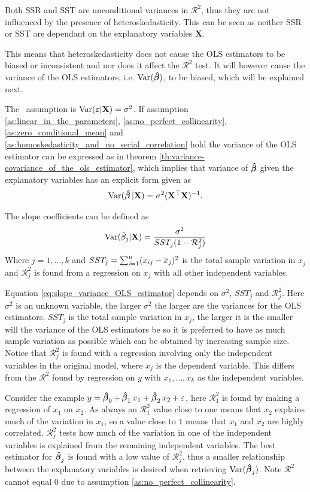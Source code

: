 Both SSR and SST are unconditional variances in $\mathcal{R}^2$, thus they are not influenced by the presence of heteroskedasticity. This can be seen as neither SSR or SST are dependant on the explanatory variables $\textbf{X}$. 

This means that heteroskedasticity does not cause the OLS estimators to be biased or inconsistent and nor does it affect the $\mathcal{R}^2$ test. 
It will however cause the variance of the OLS estimators, i.e. $\operatorname{\text{Var}}(\operatorname{\boldsymbol{\hat{\beta}}})$, to be biased, which will be explained next.  

The \homo \ assumption is $\operatorname{\text{Var}}(\boldsymbol{\varepsilon} | \mathbf{X}) = \sigma^2$. If assumption \ref{as:linear_in_the_parameters}, \ref{as:no_perfect_collinearity}, \ref{as:zero_conditional_mean} and \ref{as:homoskedasticity_and_no_serial_correlation} hold the variance of the OLS estimator can be expressed as in theorem \ref{th:variance-covariance_of_the_ols_estimator}, which implies that variance of $\operatorname{\boldsymbol{\hat{\beta}}}$ given the explanatory variables has an explicit form given as
\begin{align*}
    \operatorname{\text{Var}}(\operatorname{\boldsymbol{\hat{\beta}}} | \mathbf{X}) = \sigma^2(\mathbf{X}^\top\mathbf{X})^{-1}.
\end{align*}


The slope coefficients can be defined as 
\begin{align}\label{eq:slope_variance_OLS_estimator}
    \operatorname{\text{Var}}(\hat{\beta}_j|\mathbf{X}) = \dfrac{\sigma^2}{SST_j(1- \mathcal{R}_j^2)}
\end{align}
Where $j = 1, \ldots, k$ and $SST_j = \operatorname{\sum_{\textit{i}=1}^n} (x_{ij} - \overline{x}_j)^2$ is the total sample variation in $x_j$ and $\mathcal{R}^2_j$ is found from a regression on $x_j$ with all other independent variables. 

Equation \eqref{eq:slope_variance_OLS_estimator} depends on $\sigma^2$, $SST_j$ and $\mathcal{R}^2_j$.
Here $\sigma^2$ is an unknown variable, the larger $\sigma^2$ the larger are the variances for the OLS estimators. $SST_j$ is the total sample variation in $x_j$, the larger it is the smaller will the variance of the OLS estimators be so it is preferred to have as much sample variation as possible which can be obtained by increasing sample size. 
Notice that $\mathcal{R}^2_j$ is found with a regression involving only the independent variables in the original model, where $x_j$ is the dependent variable. 
This differs from the $\mathcal{R}^2$ found by regression on $y$ with $x_1, \ldots, x_k$ as the independent variables. 

Consider the example $y = \operatorname{\boldsymbol{\hat{\beta}}}_0 + \operatorname{\boldsymbol{\hat{\beta}}}_1 x_1 + \operatorname{\boldsymbol{\hat{\beta}}}_2 x_2 + \varepsilon$, here $\mathcal{R}^2_1$ is found by making a regression of $x_1$ on $x_2$. 
As always an $\mathcal{R}^2_1$ value close to one means that $x_2$ explains much of the variation in $x_1$, so a value close to $1$ means that $x_1$ and $x_2$ are highly correlated.
$\mathcal{R}^2_j$ tests how much of the variation in one of the independent variables is explained from the remaining independent variables.
The best estimator for $\operatorname{\boldsymbol{\hat{\beta}}}_j$ is found with a low value of $\mathcal{R}^2_j$, thus a smaller relationship between the explanatory variables is desired when retrieving $\operatorname{\text{Var}}(\operatorname{\boldsymbol{\hat{\beta}}}_j)$. Note $\mathcal{R}^2$ cannot equal $0$ due to assumption \ref{as:no_perfect_collinearity}. 

